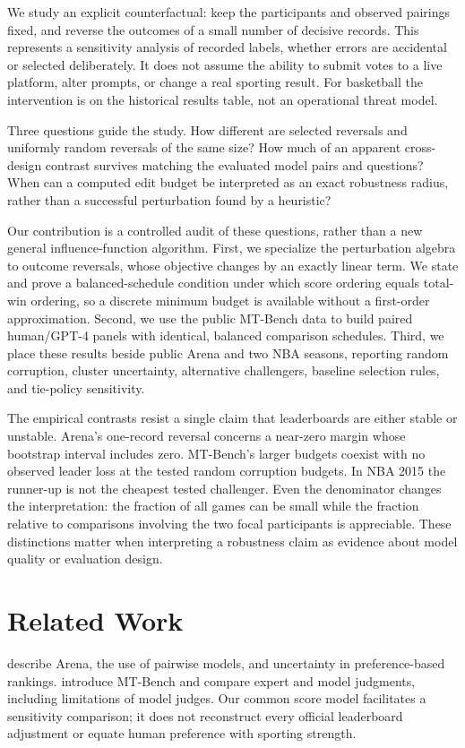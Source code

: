 \documentclass{article}
\begin{document}
We study an explicit counterfactual: keep the participants and observed pairings fixed, and reverse the outcomes of a small number of decisive records. This represents a sensitivity analysis of recorded labels, whether errors are accidental or selected deliberately. It does not assume the ability to submit votes to a live platform, alter prompts, or change a real sporting result. For basketball the intervention is on the historical results table, not an operational threat model.

Three questions guide the study. How different are selected reversals and uniformly random reversals of the same size? How much of an apparent cross-design contrast survives matching the evaluated model pairs and questions? When can a computed edit budget be interpreted as an exact robustness radius, rather than a successful perturbation found by a heuristic?

Our contribution is a controlled audit of these questions, rather than a new general influence-function algorithm. First, we specialize the perturbation algebra to outcome reversals, whose objective changes by an exactly linear term. We state and prove a balanced-schedule condition under which score ordering equals total-win ordering, so a discrete minimum budget is available without a first-order approximation. Second, we use the public MT-Bench data to build paired human/GPT-4 panels with identical, balanced comparison schedules. Third, we place these results beside public Arena and two NBA seasons, reporting random corruption, cluster uncertainty, alternative challengers, baseline selection rules, and tie-policy sensitivity.

The empirical contrasts resist a single claim that leaderboards are either stable or unstable. Arena's one-record reversal concerns a near-zero margin whose bootstrap interval includes zero. MT-Bench's larger budgets coexist with no observed leader loss at the tested random corruption budgets. In NBA 2015 the runner-up is not the cheapest tested challenger. Even the denominator changes the interpretation: the fraction of all games can be small while the fraction relative to comparisons involving the two focal participants is appreciable. These distinctions matter when interpreting a robustness claim as evidence about model quality or evaluation design.

\section{Related Work}
\citet{chiang2024} describe Arena, the use of pairwise models, and uncertainty in preference-based rankings. \citet{zheng2023} introduce MT-Bench and compare expert and model judgments, including limitations of model judges. Our common score model facilitates a sensitivity comparison; it does not reconstruct every official leaderboard adjustment or equate human preference with sporting strength.
\end{document}

